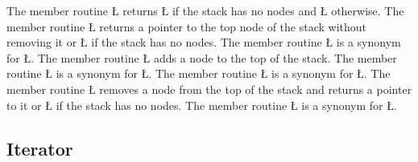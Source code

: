 \documentclass[openright,twoside]{report}
\begin{document}
The member routine \LGinlinetrue\LGbegin\lgrinde\L{}\endlgrinde\LGend{} returns \LGinlinetrue\LGbegin\lgrinde\L{}\endlgrinde\LGend{} if the stack has no nodes and \LGinlinetrue\LGbegin\lgrinde\L{}\endlgrinde\LGend{} otherwise.
The member routine \LGinlinetrue\LGbegin\lgrinde\L{}\endlgrinde\LGend{} returns a pointer to the top node of the stack without removing it or \LGinlinetrue\LGbegin\lgrinde\L{}\endlgrinde\LGend{} if the stack has no nodes.
The member routine \LGinlinetrue\LGbegin\lgrinde\L{}\endlgrinde\LGend{} is a synonym for \LGinlinetrue\LGbegin\lgrinde\L{}\endlgrinde\LGend{}.
The member routine \LGinlinetrue\LGbegin\lgrinde\L{}\endlgrinde\LGend{} adds a node to the top of the stack.
The member routine \LGinlinetrue\LGbegin\lgrinde\L{}\endlgrinde\LGend{} is a synonym for \LGinlinetrue\LGbegin\lgrinde\L{}\endlgrinde\LGend{}.
The member routine \LGinlinetrue\LGbegin\lgrinde\L{}\endlgrinde\LGend{} is a synonym for \LGinlinetrue\LGbegin\lgrinde\L{}\endlgrinde\LGend{}.
The member routine \LGinlinetrue\LGbegin\lgrinde\L{}\endlgrinde\LGend{} removes a node from the top of the stack and returns a pointer to it or \LGinlinetrue\LGbegin\lgrinde\L{}\endlgrinde\LGend{} if the stack has no nodes.
The member routine \LGinlinetrue\LGbegin\lgrinde\L{}\endlgrinde\LGend{} is a synonym for \LGinlinetrue\LGbegin\lgrinde\L{}\endlgrinde\LGend{}.


\subsection{Iterator}
\end{document}
